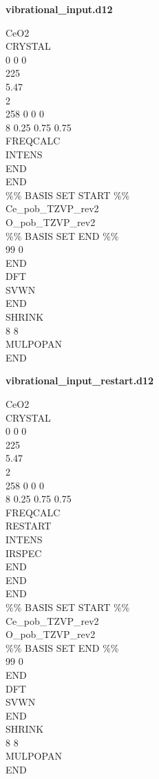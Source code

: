 \documentclass{article}
\begin{document}
\begin{minipage}[t]{0.45\textwidth}
	\textbf{vibrational\_input.d12}
	
	\vspace{15pt}
	
	CeO2
	\\CRYSTAL
	\\0 0 0 
	\\225
	\\5.47
	\\2
	\\258 0 0 0
	\\8 0.25 0.75 0.75
	\\FREQCALC
	\\INTENS
	\\END
	\\END
	\\\%\% BASIS SET START \%\%
	\\Ce\_pob\_TZVP\_rev2
	\\O\_pob\_TZVP\_rev2
	\\\%\% BASIS SET END \%\%
	\\99 0
	\\END
	\\DFT
	\\SVWN
	\\END
	\\SHRINK
	\\8 8
	\\MULPOPAN
	\\END
	
\end{minipage}
\hfill
\begin{minipage}[t]{0.45\textwidth}
	\textbf{vibrational\_input\_restart.d12}
	
	\vspace{15pt}
	
	CeO2
	\\CRYSTAL
	\\0 0 0 
	\\225
	\\5.47
	\\2
	\\258 0 0 0
	\\8 0.25 0.75 0.75
	\\FREQCALC
	\\RESTART
	\\INTENS
	\\IRSPEC
	\\END
	\\END
	\\END
	\\\%\% BASIS SET START \%\%
	\\Ce\_pob\_TZVP\_rev2
	\\O\_pob\_TZVP\_rev2
	\\\%\% BASIS SET END \%\%
	\\99 0
	\\END
	\\DFT
	\\SVWN
	\\END
	\\SHRINK
	\\8 8
	\\MULPOPAN
	\\END


\end{minipage}

\newpage

  
\end{document}
